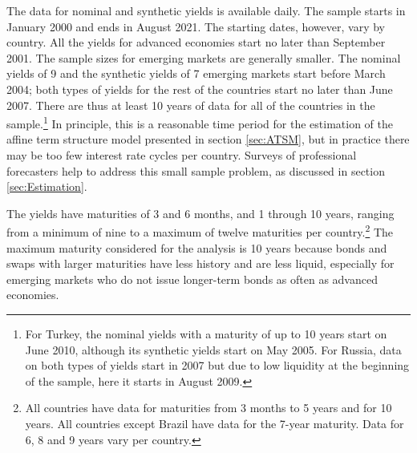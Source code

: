 {The data for nominal and synthetic yields is available daily. 
The sample starts in January 2000 and ends in August 2021. The starting dates, however,
vary by country.
All the yields for advanced economies start no later than September 2001.
The sample sizes for emerging markets are generally smaller.
The nominal yields of 9 and the synthetic yields of 7 emerging markets start before March 2004; both types of yields for the rest of the countries start no later than June 2007.
There are thus at least 10 years of data for all of the countries %
in the sample.\footnote{ For Turkey, the nominal yields with a maturity of up to 10 years start on June 2010, although its synthetic yields start on May 2005. For Russia, data on both types of yields start in 2007 but due to low liquidity at the beginning of the sample, here it starts in August 2009.}
In principle, this is a reasonable time period for the estimation of the affine term structure model presented in section \ref{sec:ATSM}, but in practice there may be too few interest rate cycles per country.
Surveys of professional forecasters help to address this small sample problem, as discussed in section \ref{sec:Estimation}. 

The yields have maturities of 3 and 6 months, and 1 through 10 years, ranging from a minimum of nine to a maximum of twelve maturities per country.\footnote{ All countries have data for maturities from 3 months to 5 years and for 10 years. All countries except Brazil have data for the 7-year maturity. Data for 6, 8 and 9 years vary per country.} 
The maximum maturity considered for the analysis is 10 years because bonds and swaps with larger maturities %
have less history and %
are less liquid, especially for emerging markets who do not issue longer-term bonds as often as advanced economies.
%	

}
